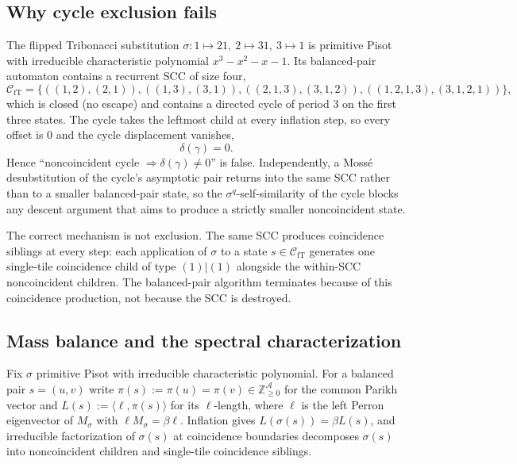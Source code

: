 \documentclass[11pt]{article}
\theoremstyle{plain}
\theoremstyle{definition}
\theoremstyle{remark}
\newcommand{\Z}{\mathbb{Z}}
\newcommand{\A}{\mathcal{A}}
\newcommand{\C}{\mathcal{C}}
\begin{document}
\subsection{Why cycle exclusion fails}

The flipped Tribonacci substitution $\sigma:1\mapsto 21,\ 2\mapsto 31,\ 3\mapsto 1$ is primitive Pisot with irreducible characteristic polynomial $x^3-x^2-x-1$. Its balanced-pair automaton contains a recurrent SCC of size four,
\[
\C_{\mathrm{fT}}=\{((1,2),(2,1)),((1,3),(3,1)),((2,1,3),(3,1,2)),((1,2,1,3),(3,1,2,1))\},
\]
which is closed (no escape) and contains a directed cycle of period 3 on the first three states. The cycle takes the leftmost child at every inflation step, so every offset is 0 and the cycle displacement vanishes,
\[
\delta(\gamma)=0.
\]
Hence ``noncoincident cycle $\Rightarrow\delta(\gamma)\ne 0$'' is false. Independently, a Moss\'e desubstitution of the cycle's asymptotic pair returns into the same SCC rather than to a smaller balanced-pair state, so the $\sigma^q$-self-similarity of the cycle blocks any descent argument that aims to produce a strictly smaller noncoincident state.

The correct mechanism is not exclusion. The same SCC produces coincidence siblings at every step: each application of $\sigma$ to a state $s\in\C_{\mathrm{fT}}$ generates one single-tile coincidence child of type $(1)|(1)$ alongside the within-SCC noncoincident children. The balanced-pair algorithm terminates because of this coincidence production, not because the SCC is destroyed.

\subsection{Mass balance and the spectral characterization}\label{sec:mass-balance}

Fix $\sigma$ primitive Pisot with irreducible characteristic polynomial. For a balanced pair $s=(u,v)$ write $\pi(s):=\pi(u)=\pi(v)\in\Z^\A_{\ge 0}$ for the common Parikh vector and $L(s):=\langle\ell,\pi(s)\rangle$ for its $\ell$-length, where $\ell$ is the left Perron eigenvector of $M_\sigma$ with $\ell M_\sigma=\beta\ell$. Inflation gives $L(\sigma(s))=\beta L(s)$, and irreducible factorization of $\sigma(s)$ at coincidence boundaries decomposes $\sigma(s)$ into noncoincident children and single-tile coincidence siblings.
\end{document}
